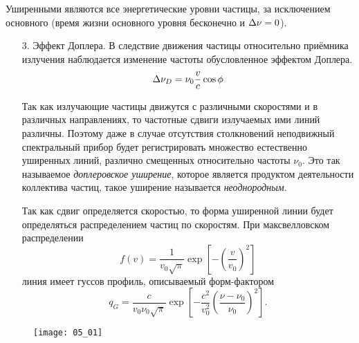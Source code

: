 Уширенными являются все энергетические уровни частицы, за исключением основного
(время жизни основного уровня бесконечно и \( \Delta\nu = 0 \)).
\begin{enumerate}
    \item[3.] Эффект Доплера.
    В следствие движения частицы относительно приёмника излучения наблюдается
    изменение частоты обусловленное эффектом Доплера.
    \[
      \Delta\nu_D = \nu_0 \frac{v}{c}\cos\phi
    \]

    Так как излучающие частицы движутся с различными скоростями и в различных
    направлениях, то частотные сдвиги излучаемых ими линий различны. Поэтому даже
    в случае отсутствия столкновений неподвижный спектральный прибор будет
    регистрировать множество естественно уширенных линий, различно смещенных
    относительно частоты \( \nu_0 \). Это так называемое \emph{доплеровское
    уширение}, которое является продуктом деятельности коллектива частиц, такое
    уширение называется \emph{неоднородным}.

    Так как сдвиг определяется скоростью, то форма уширенной линии будет
    определяться распределением частиц по скоростям. При максвелловском
    распределении
    \[
        f(v) = \frac{1}{v_0\sqrt{\pi}}
            \exp\left[-\left(\frac{v}{v_0}\right)^2\right]
    \]
    линия имеет гуссов профиль, описываемый форм-фактором
    \[
        q_G = \frac{c}{v_0\nu_0\sqrt{\pi}}\exp\left[
            -\frac{c^2}{v_0^2}\left(\frac{\nu-\nu_0}{\nu_0}\right)^2
            \right].
    \]
\end{enumerate}
\begin{figure}[h]
  \center
    \texttt{[image: 05\_01]}
\end{figure}
